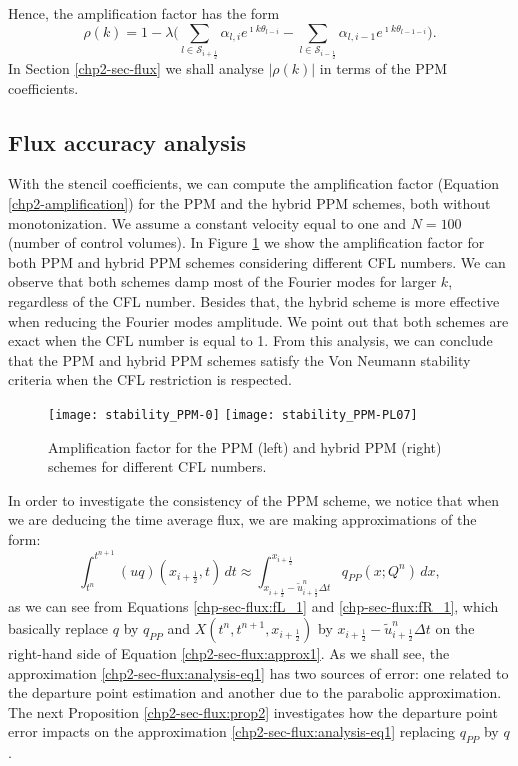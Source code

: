 Hence, the amplification factor has the form
\begin{equation}
	\label{chp2-amplification}
	\rho(k) = 1 - \lambda
	\bigg(\sum_{l \in \mathcal{S}_{i+\frac{1}{2}}} \alpha_{l,i}   e^{\imath k\theta_{l-i}} - 
	\sum_{l \in \mathcal{S}_{i-\frac{1}{2}}} \alpha_{l,i-1} e^{\imath k\theta_{l-1-i}} \bigg).
\end{equation}
In Section \ref{chp2-sec-flux} we shall analyse $|\rho(k)|$ in terms of the PPM coefficients.


\subsection{Flux accuracy analysis}
\label{chp2-sub-flux}
With the stencil coefficients, we can compute the amplification factor 
(Equation \eqref{chp2-amplification}) for the PPM and the hybrid PPM schemes, both without monotonization.
We assume a constant velocity equal to one and $N=100$ (number of control volumes).
In Figure \ref{chp2-fig-amplification} we show the amplification factor for both PPM and hybrid PPM schemes
considering different CFL numbers.
We can observe that both schemes damp most of the Fourier modes for larger $k$, regardless of the CFL number.
Besides that, the hybrid scheme is more effective when reducing the Fourier modes amplitude.
We point out that both schemes are exact when the CFL number is equal to 1.
From this analysis, we can conclude that the PPM and hybrid PPM schemes satisfy the
Von Neumann stability criteria when the CFL restriction is respected.
\begin{figure}[ht]
	\centering
	\texttt{[image: stability\_PPM-0]}
	\texttt{[image: stability\_PPM-PL07]}
	\caption{Amplification factor for the PPM (left) and hybrid PPM (right) schemes for different CFL numbers.}
	\label{chp2-fig-amplification}
\end{figure}
In order to investigate the consistency of the PPM scheme, we notice that when we are deducing the time average flux, 
we are making approximations of the form:
\begin{equation}
	\label{chp2-sec-flux:analysis-eq1}
	\int_{t^n}^{t^{n+1}} (uq)(x_{i+\frac{1}{2}},t) \,dt \approx
	\int_{x_{i+\frac{1}{2}}-\tilde{u}_{i+\frac{1}{2}}^n \Delta t}^{x_{i+\frac{1}{2}}}
	q_{PP}(x;Q^n)\,dx, 
\end{equation}
as we can see from Equations \eqref{chp-sec-flux:fL_1} and \eqref{chp-sec-flux:fR_1},
which basically replace $q$ by $q_{PP}$ and $X(t^n, t^{n+1},x_{i+\frac{1}{2}})$ by 
$x_{i+\frac{1}{2}}-\tilde{u}_{i+\frac{1}{2}}^n \Delta t$
on the right-hand side of Equation \eqref{chp2-sec-flux:approx1}.
As we shall see, the approximation \eqref{chp2-sec-flux:analysis-eq1}
has two sources of error: one related to the departure point estimation and another due to the
parabolic approximation.
The next Proposition \eqref{chp2-sec-flux:prop2} investigates how the departure point error
impacts on the approximation \eqref{chp2-sec-flux:analysis-eq1} replacing $q_{PP}$ by $q$.

